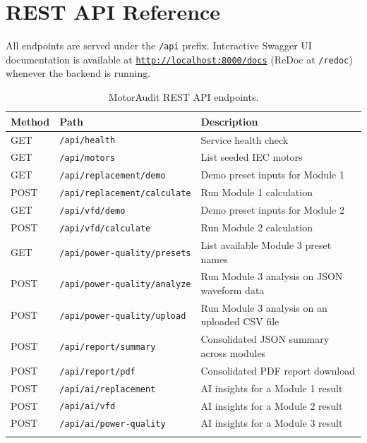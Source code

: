 \documentclass[11pt,a4paper]{article}
\newcommand{\code}[1]{\texttt{#1}}
\begin{document}
\section{REST API Reference}

All endpoints are served under the \code{/api} prefix. Interactive
Swagger UI documentation is available at
\href{http://localhost:8000/docs}{\code{http://localhost:8000/docs}}
(ReDoc at \code{/redoc}) whenever the backend is running.

\begin{longtable}{@{}p{1.7cm}p{5.3cm}p{7.3cm}@{}}
\toprule
\textbf{Method} & \textbf{Path} & \textbf{Description} \\
\midrule
\endhead
GET  & \code{/api/health} & Service health check \\
GET  & \code{/api/motors} & List seeded IEC motors \\
GET  & \code{/api/replacement/demo} & Demo preset inputs for Module 1 \\
POST & \code{/api/replacement/calculate} & Run Module 1 calculation \\
GET  & \code{/api/vfd/demo} & Demo preset inputs for Module 2 \\
POST & \code{/api/vfd/calculate} & Run Module 2 calculation \\
GET  & \code{/api/power-quality/presets} & List available Module 3 preset names \\
POST & \code{/api/power-quality/analyze} & Run Module 3 analysis on JSON waveform data \\
POST & \code{/api/power-quality/upload} & Run Module 3 analysis on an uploaded CSV file \\
POST & \code{/api/report/summary} & Consolidated JSON summary across modules \\
POST & \code{/api/report/pdf} & Consolidated PDF report download \\
POST & \code{/api/ai/replacement} & AI insights for a Module 1 result \\
POST & \code{/api/ai/vfd} & AI insights for a Module 2 result \\
POST & \code{/api/ai/power-quality} & AI insights for a Module 3 result \\
\bottomrule
\caption{MotorAudit REST API endpoints.}
\end{longtable}

\end{document}
